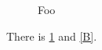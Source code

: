 \begin{figure}
\label{A}
\end{figure}

\begin{figure}
Foo
\end{figure}

\begin{figure}
\label{C}
\end{figure}

There is \ref{A} and \cref{B}.